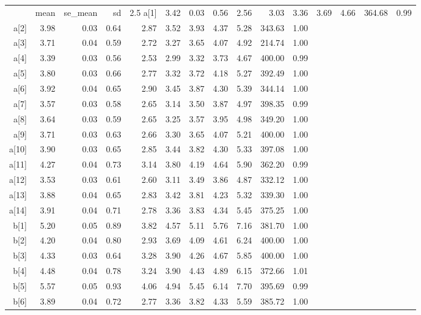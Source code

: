 \begin{longtable}{rrrrrrrrrrr}
  \hline
 & mean & se_mean & sd & 2.5%
  \hline \endhead  \hline
a[1] & 3.42 & 0.03 & 0.56 & 2.56 & 3.03 & 3.36 & 3.69 & 4.66 & 364.68 & 0.99 \\ 
  a[2] & 3.98 & 0.03 & 0.64 & 2.87 & 3.52 & 3.93 & 4.37 & 5.28 & 343.63 & 1.00 \\ 
  a[3] & 3.71 & 0.04 & 0.59 & 2.72 & 3.27 & 3.65 & 4.07 & 4.92 & 214.74 & 1.00 \\ 
  a[4] & 3.39 & 0.03 & 0.56 & 2.53 & 2.99 & 3.32 & 3.73 & 4.67 & 400.00 & 0.99 \\ 
  a[5] & 3.80 & 0.03 & 0.66 & 2.77 & 3.32 & 3.72 & 4.18 & 5.27 & 392.49 & 1.00 \\ 
  a[6] & 3.92 & 0.04 & 0.65 & 2.90 & 3.45 & 3.87 & 4.30 & 5.39 & 344.14 & 1.00 \\ 
  a[7] & 3.57 & 0.03 & 0.58 & 2.65 & 3.14 & 3.50 & 3.87 & 4.97 & 398.35 & 0.99 \\ 
  a[8] & 3.64 & 0.03 & 0.59 & 2.65 & 3.25 & 3.57 & 3.95 & 4.98 & 349.20 & 1.00 \\ 
  a[9] & 3.71 & 0.03 & 0.63 & 2.66 & 3.30 & 3.65 & 4.07 & 5.21 & 400.00 & 1.00 \\ 
  a[10] & 3.90 & 0.03 & 0.65 & 2.85 & 3.44 & 3.82 & 4.30 & 5.33 & 397.08 & 1.00 \\ 
  a[11] & 4.27 & 0.04 & 0.73 & 3.14 & 3.80 & 4.19 & 4.64 & 5.90 & 362.20 & 0.99 \\ 
  a[12] & 3.53 & 0.03 & 0.61 & 2.60 & 3.11 & 3.49 & 3.86 & 4.87 & 332.12 & 1.00 \\ 
  a[13] & 3.88 & 0.04 & 0.65 & 2.83 & 3.42 & 3.81 & 4.23 & 5.32 & 339.30 & 1.00 \\ 
  a[14] & 3.91 & 0.04 & 0.71 & 2.78 & 3.36 & 3.83 & 4.34 & 5.45 & 375.25 & 1.00 \\ 
  b[1] & 5.20 & 0.05 & 0.89 & 3.82 & 4.57 & 5.11 & 5.76 & 7.16 & 381.70 & 1.00 \\ 
  b[2] & 4.20 & 0.04 & 0.80 & 2.93 & 3.69 & 4.09 & 4.61 & 6.24 & 400.00 & 1.00 \\ 
  b[3] & 4.33 & 0.03 & 0.64 & 3.28 & 3.90 & 4.26 & 4.67 & 5.85 & 400.00 & 1.00 \\ 
  b[4] & 4.48 & 0.04 & 0.78 & 3.24 & 3.90 & 4.43 & 4.89 & 6.15 & 372.66 & 1.01 \\ 
  b[5] & 5.57 & 0.05 & 0.93 & 4.06 & 4.94 & 5.45 & 6.14 & 7.70 & 395.69 & 0.99 \\ 
  b[6] & 3.89 & 0.04 & 0.72 & 2.77 & 3.36 & 3.82 & 4.33 & 5.59 & 385.72 & 1.00 \\ 

\end{longtable}
